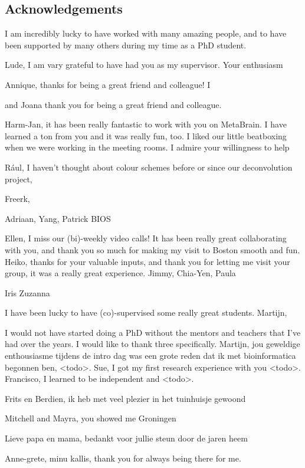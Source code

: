 \begin{appendices}
\chapter{Acknowledgements}

I am incredibly lucky to have worked with many amazing people, and to have been supported by many others during my time as a PhD  student. 

Lude, I am vary grateful to have had you as my supervisor. Your enthusiasm 

Annique, thanks for being a great friend and colleague! I 

 and Joana thank you for being a great friend and colleague. 

Harm-Jan, it has been really fantastic to work with you on MetaBrain. I have learned a ton from you and it was really fun, too. I liked our little beatboxing when we were working in the meeting rooms. I admire your willingness to help 

R\'aul, I haven't thought about colour schemes before or since our deconvolution project, 

Freerk,

Adriaan,
Yang, 
Patrick
BIOS


Ellen, I miss our (bi)-weekly video calls! It has been really great collaborating with you, and thank you so much for making my visit to Boston smooth and fun. Heiko, thanks for your valuable inputs, and thank you for letting me visit your group, it was a really great experience. Jimmy, Chia-Yen, Paula

Iris
Zuzanna

I have been lucky to have (co)-supervised some really great students. Martijn, 

I would not have started doing a PhD without the mentors and teachers that I've had over the years. I would like to thank three specifically. Martijn, jou geweldige enthousiasme tijdens de intro dag was een grote reden dat ik met bioinformatica begonnen ben, <todo>. Sue, I got my first research experience with you <todo>. Francisco, I learned to be independent and <todo>.

Frits en Berdien, ik heb met veel plezier in het tuinhuisje gewoond

Mitchell and Mayra, you showed me Groningen 

Lieve papa en mama, bedankt voor jullie steun door de jaren heem

Anne-grete, minu kallis, thank you for always being there for me. 


\end{appendices}
